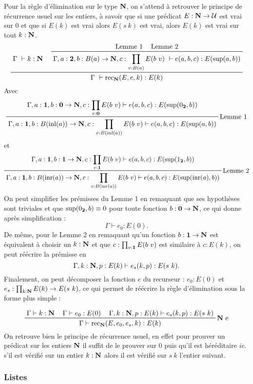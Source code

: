\documentclass[../../rapport.tex]{subfiles}
\begin{document}
  Pour la règle d'élimination sur le type $\mathbf N$, on s'attend à retrouver le principe de récurrence usuel sur les entiers,
  à savoir que si une prédicat $E : \mathbf N \rightarrow \mathcal U$ est vrai sur $0$ et que si $E(k)$ est vrai alors $E(s\ k)$ est vrai,
  alors $E(k)$ est vrai sur tout $k : \mathbf N$.
  $$
  \prfinterspace=1.2em
  \prftree
    {\Gamma\ \vdash k : \N}
    {\prftree
      {\text{Lemme 1}}
      {\text{Lemme 2}}
    {\Gamma, a : \2, b : B(a) \fun \N, c : \prod_{v : B(a)}{E(b\ v)}\ \vdash e(a, b, c) : E(\sup(a, b))}}
    {\Gamma\ \vdash \rec_{\N}(E, e, k) : E(k)}
  $$
  Avec
  $$\prfinterspace=1.2em
  \prftree[r]{Lemme 1}
    {\Gamma, a : \1, b : \0 \fun \N, c : \prod_{v : \0}E(b\ v) \vdash e(a, b, c) : E(\sup(0_{\2}, b))}
  {\Gamma, a : \1, b : B(\inl(a)) \fun \N, c : \prod_{v : B(\inl(a))}E(b\ v) \vdash e(a, b, c) : E(\sup(a, b))}
  $$
  et
  $$\prfinterspace=1.2em
  \prftree[r]{Lemme 2}
  {\Gamma, a : \1, b : \1 \fun \N, c : \prod_{v : \1}E(b\ v) \vdash e(a, b, c) : E(\sup(1_{\2}, b))}
  {\Gamma, a : \1, b : B(\inr(a)) \fun \N, c : \prod_{v:B(\inr(a))}E(b\ v) \vdash e(a, b, c) : E(\sup(\inr(a), b))}
  $$
  On peut simplifier les prémisses du Lemme 1 en remaquant que ses hypothèses sont triviales et que $\sup(0_{\operatorname{\textbf{2}}}, b) \equiv 0$
  pour toute fonction $b : \operatorname{\textbf{0}} \rightarrow \mathbf N$, ce qui donne après simplification :
  $$\Gamma \vdash e_0 : E(0).$$
  De même, pour le Lemme 2 en remaquant qu'un fonction $b : \operatorname{\textbf{1}} \rightarrow \mathbf N$ est équivalent à choisir un $k : \mathbf N$ et que
  $c : \prod_{v:\operatorname{\textbf{1}}}E(b\ v)$ est similaire à $c : E(k)$, on peut réécrire la prémisse en
  $$\Gamma, k : \mathbf N, p : E(k) \vdash e_s(k, p) : E(s\ k).$$
  Finalement, on peut décomposer la fonction $e$ du recurseur : $e_0 : E(0)$ et $e_s : \prod_{k : \N}E(k) \fun E(s\ k)$,
  ce qui permet de réécrire la règle d'élimination sous la forme plus simple :

  $$\prfinterspace=1.2em
  \prftree[r]{$\N$ e}
    {\Gamma \vdash k : \N}
    {\Gamma \vdash e_0 : E(0)}
    {\Gamma, k : \N, p : E(k) \vdash e_s(k, p) : E(s\ k)}
  {\Gamma \vdash \rec_{\N}(E, e_0, e_s, k) : E(k)}
  $$
  On retrouve bien le principe de récurrence usuel, en effet pour prouver un prédicat sur les entiers $\mathbf N$
  il suffit de le prouver sur $0$ puis qu'il est héréditaire \textit{ie}. s'il est vérifié sur un entier $k : \mathbf N$
  alors il est vérifié sur $s\ k$ l'entier suivant.

  \subsubsection{Listes}
\end{document}
